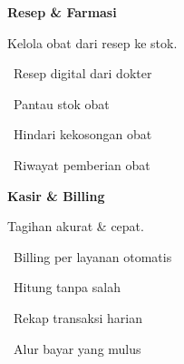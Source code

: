 \documentclass[a4paper]{article}
\begin{document}
\vspace{8pt}

\noindent
\begin{minipage}[t]{0.485\textwidth}
    \colorbox{PurplePrimary}{%
        \begin{minipage}{\dimexpr\textwidth-2\fboxsep\relax}
            {\fontsize{10}{13}\selectfont\bfseries\color{White} Resep \& Farmasi}
        \end{minipage}}\par
    \vspace{4pt}
    {\fontsize{9}{12}\selectfont\color{TextDark}%
    Kelola obat dari resep ke stok.\par\vspace{3pt}
    \textbullet\ Resep digital dari dokter\par\vspace{2pt}%
    \textbullet\ Pantau stok obat\par\vspace{2pt}%
    \textbullet\ Hindari kekosongan obat\par\vspace{2pt}%
    \textbullet\ Riwayat pemberian obat}%

\end{minipage}%
\hfill
\begin{minipage}[t]{0.485\textwidth}
    \colorbox{BlueDark}{%
        \begin{minipage}{\dimexpr\textwidth-2\fboxsep\relax}
            {\fontsize{10}{13}\selectfont\bfseries\color{White} Kasir \& Billing}
        \end{minipage}}\par
    \vspace{4pt}
    {\fontsize{9}{12}\selectfont\color{TextDark}%
    Tagihan akurat \& cepat.\par\vspace{3pt}
    \textbullet\ Billing per layanan otomatis\par\vspace{2pt}%
    \textbullet\ Hitung tanpa salah\par\vspace{2pt}%
    \textbullet\ Rekap transaksi harian\par\vspace{2pt}%
    \textbullet\ Alur bayar yang mulus}%

\end{minipage}

\vspace{8pt}
\end{document}
